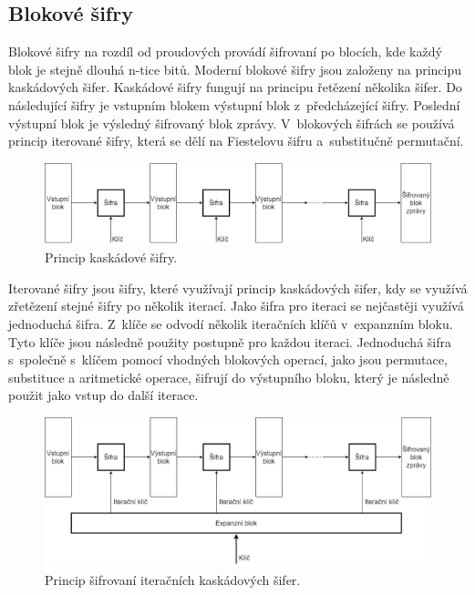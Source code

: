 \subsection{Blokové šifry \label{subsec:blockFunction}}%
Blokové šifry na rozdíl od proudových provádí šifrovaní po blocích, kde každý blok je stejně dlouhá n-tice bitů. Moderní blokové šifry jsou založeny na principu kaskádových šifer. Kaskádové šifry fungují na principu řetězení několika šifer. Do následující šifry je vstupním blokem výstupní blok z~předcházející šifry. Poslední výstupní blok je výsledný šifrovaný blok zprávy. V~blokových šifrách se používá princip iterované šifry, která se dělí na Fiestelovu šifru a~substitučně permutační.\cite{Burda9788021446120ISBN}
\begin{figure}[!h]
  \begin{center}
    \includegraphics[scale=0.3]{obrazky/cascadeCipher.png}
  \end{center}
  \caption[Kaskádová šifra]{Princip kaskádové šifry.\cite{Burda9788021446120ISBN}}
  \label{img:CascadeCipher}
\end{figure}

Iterované šifry jsou šifry, které využívají princip kaskádových šifer, kdy se využívá zřetězení stejné šifry po několik iterací. Jako šifra pro iteraci se nejčastěji využívá jednoduchá šifra. Z~klíče se odvodí několik iteračních klíčů v~expanzním bloku. Tyto klíče jsou následně použity postupně pro každou iteraci. Jednoduchá šifra s~společně s~klíčem pomocí vhodných blokových operací, jako jsou permutace, substituce a aritmetické operace, šifrují do výstupního bloku, který je následně použit jako vstup do další iterace.\cite{Burda9788021446120ISBN}
\begin{figure}[!h]
  \begin{center}
    \includegraphics[scale=0.3]{obrazky/IterateCipher.png}
  \end{center}
  \caption[Iterační kaskádová šifra]{Princip šifrovaní iteračních kaskádových šifer.\cite{Burda9788021446120ISBN}}
  \label{img:iterateCipher}
\end{figure}

